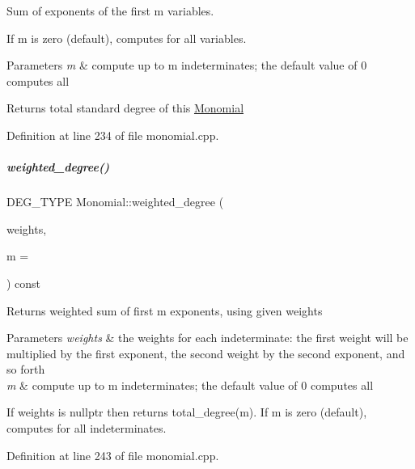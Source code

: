 Sum of exponents of the first {\ttfamily m} variables. 

If {\ttfamily m} is zero (default), computes for all variables. 
\begin{DoxyParams}{Parameters}
{\em m} & compute up to {\ttfamily m} indeterminates; the default value of 0 computes all \\
\hline
\end{DoxyParams}
\begin{DoxyReturn}{Returns}
total standard degree of this \hyperlink{group__polygroup_class_monomial}{Monomial} 
\end{DoxyReturn}


Definition at line 234 of file monomial.\+cpp.

\mbox{\label{group__polygroup_a5b19863967dc9801997d2d1058f312a3}} 
\subparagraph{\texorpdfstring{weighted\+\_\+degree()}{weighted\_degree()}}
{\footnotesize\ttfamily D\+E\+G\+\_\+\+T\+Y\+PE Monomial\+::weighted\+\_\+degree (\begin{DoxyParamCaption}\item[{const W\+T\+\_\+\+T\+Y\+PE $\ast$}]{weights,  }\item[{N\+V\+A\+R\+\_\+\+T\+Y\+PE}]{m = {} }\end{DoxyParamCaption}) const}

\begin{DoxyReturn}{Returns}
weighted sum of first {\ttfamily m} exponents, using given {\ttfamily weights} 
\end{DoxyReturn}

\begin{DoxyParams}{Parameters}
{\em weights} & the weights for each indeterminate\+: the first weight will be multiplied by the first exponent, the second weight by the second exponent, and so forth \\
\hline
{\em m} & compute up to {\ttfamily m} indeterminates; the default value of 0 computes all\\
\hline
\end{DoxyParams}
If {\ttfamily weights} is {\ttfamily nullptr} then returns total\+\_\+degree(m). If {\ttfamily m} is zero (default), computes for all indeterminates. 

Definition at line 243 of file monomial.\+cpp.

\label{class_monomial___ideal}
